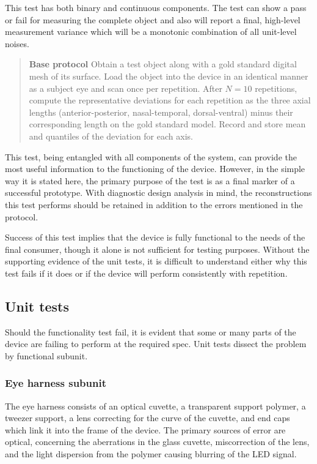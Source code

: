\documentclass{article}
\begin{document}
This test has both binary and continuous components. The test can show a pass or fail for measuring the complete object and also will report a final, high-level measurement variance which will be a monotonic combination of all unit-level noises.

\begin{quotation}
\noindent\textbf{Base protocol} Obtain a test object along with a gold standard digital mesh of its surface. Load the object into the device in an identical manner as a subject eye and scan once per repetition. After $N = 10$ repetitions, compute the representative deviations for each repetition as the three axial lengths (anterior-posterior, nasal-temporal, dorsal-ventral) minus their corresponding length on the gold standard model. Record and store mean and quantiles of the deviation for each axis.
\end{quotation}

This test, being entangled with all components of the system, can provide the most useful information to the functioning of the device. However, in the simple way it is stated here, the primary purpose of the test is as a final marker of a successful prototype. With diagnostic design analysis in mind, the reconstructions this test performs should be retained in addition to the errors mentioned in the protocol.

Success of this test implies that the device is fully functional to the needs of the final consumer, though it alone is not sufficient for testing purposes. Without the supporting evidence of the unit tests, it is difficult to understand either why this test fails if it does or if the device will perform consistently with repetition.

\subsection{Unit tests}
\label{sec:unit-tests}

Should the functionality test fail, it is evident that some or many parts of the device are failing to perform at the required spec. Unit tests dissect the problem by functional subunit.


\subsubsection{Eye harness subunit}
The eye harness consists of an optical cuvette, a transparent support polymer, a tweezer support, a lens correcting for the curve of the cuvette, and end caps which link it into the frame of the device. The primary sources of error are optical, concerning the aberrations in the glass cuvette, miscorrection of the lens, and the light dispersion from the polymer causing blurring of the LED signal.
\end{document}
